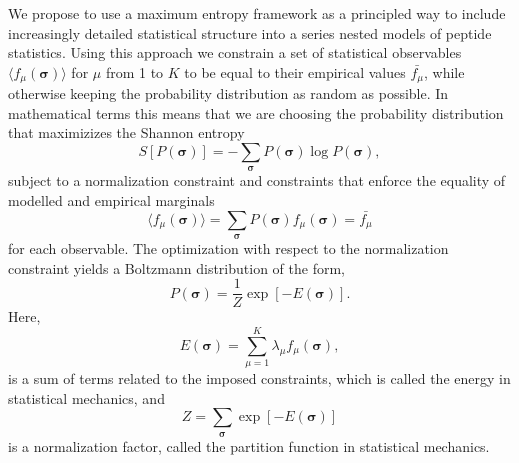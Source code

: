 \documentclass[superscriptaddress,twocolumn,pre]{revtex4}
\newcommand{\B}{\boldsymbol}
\newcommand{\<}{\langle}
\renewcommand{\>}{\rangle}
\begin{document}
We propose to use a maximum entropy framework as a principled way to include increasingly detailed statistical structure into a series nested models of peptide statistics. Using this approach we constrain a set of statistical observables $\langle f_\mu(\boldsymbol \sigma)\rangle$ for $\mu$ from 1 to $K$ to be equal to their empirical values $\bar{f_\mu}$, while otherwise keeping the probability distribution as random as possible. In mathematical terms this means that we are choosing the probability distribution that maximizizes the Shannon entropy
\begin{equation}
    S[P(\B \sigma)] = - \sum_{\B \sigma} P(\B \sigma) \log P(\B \sigma),
\end{equation}
subject to a normalization constraint and constraints that enforce the equality of modelled and empirical marginals
\begin{equation}
    \langle f_\mu(\boldsymbol \sigma)\rangle = \sum_{\boldsymbol \sigma} P(\boldsymbol \sigma) f_\mu(\boldsymbol \sigma) = \bar{f_\mu}
\end{equation}
for each observable.
The optimization with respect to the normalization constraint yields a Boltzmann distribution of the form,
\begin{equation}
    P(\boldsymbol \sigma) = \frac{1}{Z} \exp\left[ -E(\B \sigma) \right].
\end{equation}
Here,
\begin{equation}
 E(\B \sigma) = \sum_{\mu=1}^K \lambda_\mu f_\mu(\boldsymbol \sigma),
\end{equation}
is a sum of terms related to the imposed constraints, which is called the energy in statistical mechanics, and 
\begin{equation}
    Z = \sum_{\B \sigma} \exp \left[ - E(\B \sigma) \right]
\end{equation}
is a normalization factor, called the partition function in statistical mechanics.
\end{document}
